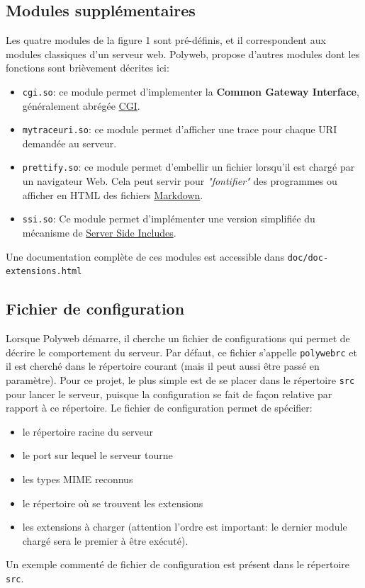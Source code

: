 \documentclass[10pt,a4paper]{article}
\begin{document}
\subsection*{Modules supplémentaires}

Les quatre modules de la figure 1 sont pré-définis, et il
correspondent aux modules classiques d'un serveur web. Polyweb,
propose d'autres modules dont les fonctions sont brièvement décrites
ici:
\begin{itemize}
\item \texttt{cgi.so}: ce module permet d'implementer la \textbf{Common
    Gateway Interface}, généralement abrégée
  \href{http://fr.wikipedia.org/wiki/Common\_Gateway\_Interface}{CGI}.

\item \texttt{mytraceuri.so}: ce module permet d'afficher une trace
  pour chaque URI demandée au serveur.

\item \texttt{prettify.so}: ce module permet d'embellir un fichier
  lorsqu'il est chargé par un navigateur Web. Cela peut servir pour
  \emph{"fontifier"} des programmes ou afficher en HTML des fichiers
  \href{http://fr.wikipedia.org/wiki/Markdown}{Markdown}.

\item \texttt{ssi.so}: Ce module permet d'implémenter une version
  simplifiée du mécanisme de
  \href{http://fr.wikipedia.org/wiki/Server_Side_Includes}{Server Side Includes}.
\end{itemize}

Une documentation complète de ces modules est accessible dans
\texttt{doc/doc-extensions.html}

\subsection*{Fichier de configuration}

Lorsque Polyweb démarre, il cherche un fichier de configurations qui
permet de décrire le comportement du serveur. Par défaut, ce fichier
s'appelle \texttt{polywebrc} et il est cherché dans le répertoire courant
(mais il peut aussi être passé en paramètre). Pour ce projet, le plus
simple est de se placer dans le répertoire \texttt{src} pour lancer le
serveur, puisque la configuration se fait de façon relative par
rapport à ce répertoire. Le fichier de configuration permet de spécifier:
\begin{itemize}
\item le répertoire racine du serveur
\item le port sur lequel le serveur tourne 
\item les types MIME reconnus
\item le répertoire où se trouvent les extensions
\item les extensions à charger (attention l'ordre est important: le
  dernier module chargé sera le premier à être exécuté).
\end{itemize}
Un exemple commenté de fichier de configuration est présent dans le
répertoire \texttt{src}. 
\end{document}
